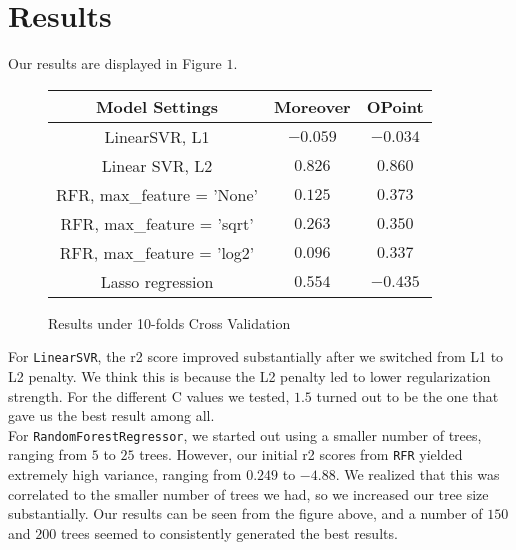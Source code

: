 
\section{Results}
\label{sec:results}
Our results are displayed in Figure $1$.
\begin{figure}[htb]
  \centering %

  \begin{tabular}{|c|c|c|} 
    \hline \hline %
    \textbf{Model Settings} & \textbf{Moreover} & \textbf{OPoint} \\ %
    \hline %
    LinearSVR, L1 & $-0.059$ & $-0.034$ \\
    Linear SVR, L2 & $0.826$ & $0.860$\\
    RFR, max\_feature = 'None' & $0.125$ & $0.373$ \\
    RFR, max\_feature = 'sqrt' & $0.263$ & $0.350$ \\
    RFR, max\_feature = 'log2' & $0.096$ & $0.337$ \\
    Lasso regression & $0.554$ & $-0.435$ \\
    \hline \hline
  \end{tabular}

  \caption{Results under 10-folds Cross Validation}
  \label{tab:example}

\end{figure}
For \texttt{LinearSVR}, the r2 score improved substantially after we switched from L1 to L2 penalty. We think this is because the L2 penalty led to lower regularization strength. For the different C values we tested, $1.5$ turned out to be the one that gave us the best result among all. \\
For \texttt{RandomForestRegressor}, we started out using a smaller number of trees, ranging from $5$ to $25$ trees. However, our initial r2 scores from \texttt{RFR} yielded extremely high variance, ranging from $0.249$ to $-4.88$. We realized that this was correlated to the smaller number of trees we had, so we increased our tree size substantially. Our results can be seen from the figure above, and a number of $150$ and $200$ trees seemed to consistently generated the best results.\\
